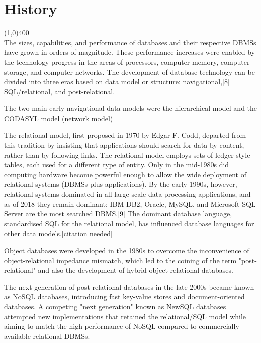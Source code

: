 \documentclass{article}
\begin{document}
\section{History}
\line(1,0){400}\\
The sizes, capabilities, and performance of databases and their respective DBMSs have grown in orders of magnitude. These performance increases were enabled by the technology progress in the areas of processors, computer memory, computer storage, and computer networks. The development of database technology can be divided into three eras based on data model or structure: navigational,[8] SQL/relational, and post-relational.

The two main early navigational data models were the hierarchical model and the CODASYL model (network model)

The relational model, first proposed in 1970 by Edgar F. Codd, departed from this tradition by insisting that applications should search for data by content, rather than by following links. The relational model employs sets of ledger-style tables, each used for a different type of entity. Only in the mid-1980s did computing hardware become powerful enough to allow the wide deployment of relational systems (DBMSs plus applications). By the early 1990s, however, relational systems dominated in all large-scale data processing applications, and as of 2018 they remain dominant: IBM DB2, Oracle, MySQL, and Microsoft SQL Server are the most searched DBMS.[9] The dominant database language, standardised SQL for the relational model, has influenced database languages for other data models.[citation needed]

Object databases were developed in the 1980s to overcome the inconvenience of object-relational impedance mismatch, which led to the coining of the term "post-relational" and also the development of hybrid object-relational databases.

The next generation of post-relational databases in the late 2000s became known as NoSQL databases, introducing fast key-value stores and document-oriented databases. A competing "next generation" known as NewSQL databases attempted new implementations that retained the relational/SQL model while aiming to match the high performance of NoSQL compared to commercially available relational DBMSs.
 

\newpage
\end{document}
